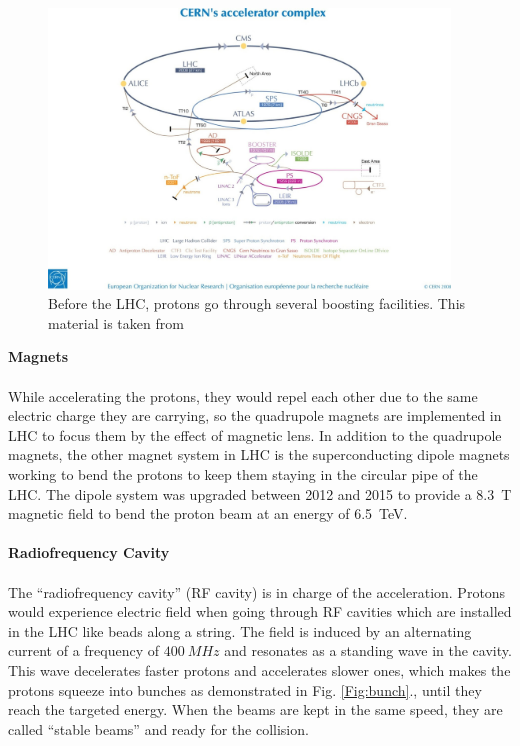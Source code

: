 \\
\begin{figure}[!h]                
	\includegraphics[width=0.95\textwidth]{Chapter2/pre-acceleration.jpg}
	\centering
	\begin{center}
		\caption{Before the LHC, protons go through several boosting facilities. This material is taken from \cite{Mobs:2197559}}
		\label{Fig:boost}            
	\end{center}
\end{figure}
{\bf Magnets}
\\
\\While accelerating the protons, they  would repel each other due to the same electric charge they are carrying, so the quadrupole magnets are implemented in LHC to focus them by the effect of magnetic lens. In addition to the quadrupole magnets, the other magnet system in LHC is the superconducting dipole magnets working to bend the protons to keep them staying in the circular pipe of the LHC. The dipole system was upgraded between 2012 and 2015 to provide a 8.3~T magnetic field to bend the proton beam at an energy of 6.5~TeV.
\\
\\{\bf Radiofrequency Cavity\cite{Radiofrequency:1997424}}  
\\
\\The ``radiofrequency cavity'' (RF cavity) is in charge of the acceleration. Protons would experience electric field when going through RF cavities which are installed in the LHC like beads along a string. The field is induced by an alternating current of a frequency of $400~MHz$ and resonates as a standing wave in the cavity. This wave decelerates faster protons and accelerates slower ones, which makes the protons squeeze into bunches as demonstrated in Fig. \ref{Fig:bunch}., until they reach the targeted energy. When the beams are kept in the same speed, they are called ``stable beams'' and ready for the collision. 
